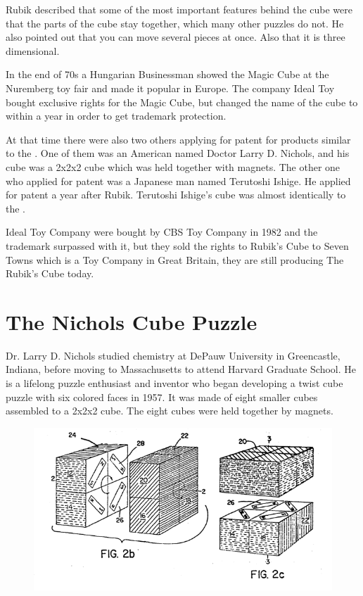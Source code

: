 Rubik described that some of the most important features behind the cube were that the parts of the cube stay together, which many other puzzles do not. He also pointed out that you can move several pieces at once. Also that it is three dimensional. 

In the end of 70s a Hungarian Businessman showed the Magic Cube at the Nuremberg toy fair and made it popular in Europe. The company Ideal Toy bought exclusive rights for the Magic Cube, but changed the name of the cube to \rubik{} within a year in order to get trademark protection.

At that time there were also two others applying for patent for products similar to the \rubik{}.  One of them was an American named Doctor Larry D. Nichols, and his cube was a 2x2x2 cube which was held together with magnets. The other one who applied for patent was a Japanese man named Terutoshi Ishige. He applied for patent a year after Rubik. Terutoshi Ishige's cube was almost identically to the \rubik{}.

Ideal Toy Company were bought by CBS Toy Company in 1982 and the trademark surpassed with it, but they sold the rights to Rubik's Cube to Seven Towns which is a Toy Company in Great Britain, they are still producing The Rubik's Cube today.
\section{The Nichols Cube Puzzle}
Dr. Larry D. Nichols studied chemistry at DePauw University in Greencastle, Indiana, before moving to Massachusetts to attend Harvard Graduate School. 
He is a lifelong puzzle enthusiast and inventor who  began developing a twist cube puzzle with six colored faces in 1957. It was made of eight smaller cubes assembled to a 2x2x2 cube. The eight cubes were held together by magnets.


\begin{figure}
	\centering
		\includegraphics[scale=0.8]{input/pics/Nicholspatent2.png}
	\caption{}
	\label{fig:Nicholspatent2}
\end{figure}


